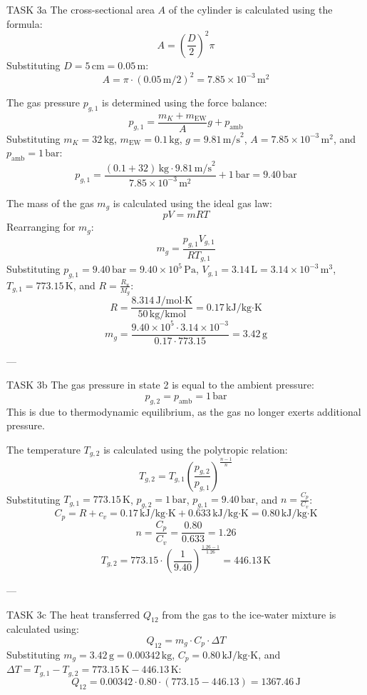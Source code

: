 TASK 3a  
The cross-sectional area \( A \) of the cylinder is calculated using the formula:  
\[
A = \left( \frac{D}{2} \right)^2 \pi
\]  
Substituting \( D = 5 \, \text{cm} = 0.05 \, \text{m} \):  
\[
A = \pi \cdot \left( 0.05 \, \text{m} / 2 \right)^2 = 7.85 \times 10^{-3} \, \text{m}^2
\]  

The gas pressure \( p_{g,1} \) is determined using the force balance:  
\[
p_{g,1} = \frac{m_K + m_{\text{EW}}}{A} g + p_{\text{amb}}
\]  
Substituting \( m_K = 32 \, \text{kg} \), \( m_{\text{EW}} = 0.1 \, \text{kg} \), \( g = 9.81 \, \text{m/s}^2 \), \( A = 7.85 \times 10^{-3} \, \text{m}^2 \), and \( p_{\text{amb}} = 1 \, \text{bar} \):  
\[
p_{g,1} = \frac{(0.1 + 32) \, \text{kg} \cdot 9.81 \, \text{m/s}^2}{7.85 \times 10^{-3} \, \text{m}^2} + 1 \, \text{bar} = 9.40 \, \text{bar}
\]  

The mass of the gas \( m_g \) is calculated using the ideal gas law:  
\[
p V = m R T
\]  
Rearranging for \( m_g \):  
\[
m_g = \frac{p_{g,1} V_{g,1}}{R T_{g,1}}
\]  
Substituting \( p_{g,1} = 9.40 \, \text{bar} = 9.40 \times 10^5 \, \text{Pa} \), \( V_{g,1} = 3.14 \, \text{L} = 3.14 \times 10^{-3} \, \text{m}^3 \), \( T_{g,1} = 773.15 \, \text{K} \), and \( R = \frac{R_u}{M_g} \):  
\[
R = \frac{8.314 \, \text{J/mol·K}}{50 \, \text{kg/kmol}} = 0.17 \, \text{kJ/kg·K}
\]  
\[
m_g = \frac{9.40 \times 10^5 \cdot 3.14 \times 10^{-3}}{0.17 \cdot 773.15} = 3.42 \, \text{g}
\]  

---

TASK 3b  
The gas pressure in state 2 is equal to the ambient pressure:  
\[
p_{g,2} = p_{\text{amb}} = 1 \, \text{bar}
\]  
This is due to thermodynamic equilibrium, as the gas no longer exerts additional pressure.  

The temperature \( T_{g,2} \) is calculated using the polytropic relation:  
\[
T_{g,2} = T_{g,1} \left( \frac{p_{g,2}}{p_{g,1}} \right)^{\frac{n-1}{n}}
\]  
Substituting \( T_{g,1} = 773.15 \, \text{K} \), \( p_{g,2} = 1 \, \text{bar} \), \( p_{g,1} = 9.40 \, \text{bar} \), and \( n = \frac{C_p}{C_v} \):  
\[
C_p = R + c_v = 0.17 \, \text{kJ/kg·K} + 0.633 \, \text{kJ/kg·K} = 0.80 \, \text{kJ/kg·K}
\]  
\[
n = \frac{C_p}{C_v} = \frac{0.80}{0.633} = 1.26
\]  
\[
T_{g,2} = 773.15 \cdot \left( \frac{1}{9.40} \right)^{\frac{1.26 - 1}{1.26}} = 446.13 \, \text{K}
\]  

---

TASK 3c  
The heat transferred \( Q_{12} \) from the gas to the ice-water mixture is calculated using:  
\[
Q_{12} = m_g \cdot C_p \cdot \Delta T
\]  
Substituting \( m_g = 3.42 \, \text{g} = 0.00342 \, \text{kg} \), \( C_p = 0.80 \, \text{kJ/kg·K} \), and \( \Delta T = T_{g,1} - T_{g,2} = 773.15 \, \text{K} - 446.13 \, \text{K} \):  
\[
Q_{12} = 0.00342 \cdot 0.80 \cdot (773.15 - 446.13) = 1367.46 \, \text{J}
\]